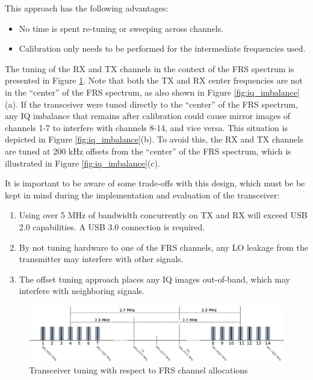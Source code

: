 This approach has the following advantages:
\begin{itemize}
  \item No time is spent re-tuning or sweeping across channels.
  \item Calibration only needs to be performed for the intermediate
        frequencies used.
\end{itemize}

The tuning of the \ac{RX} and \ac{TX} channels in the context of the
\ac{FRS} spectrum is presented in Figure \ref{fig:tuning}.  Note that both
the \ac{TX} and \ac{RX} center frequencies are not in the ``center'' of the
\ac{FRS} spectrum, as also shown in Figure \ref{fig:iq_imbalance}(a).
If the transceiver were tuned directly to the ``center'' of the \ac{FRS}
spectrum, any IQ imbalance that remains after calibration could cause mirror
images of channels 1-7 to interfere with channels 8-14, and vice versa. This situation
is depicted in Figure \ref{fig:iq_imbalance}(b). To avoid this, the \ac{RX} and
\ac{TX} channels are tuned at 200 kHz offsets from the ``center'' of the
\ac{FRS} spectrum, which is illustrated in Figure \ref{fig:iq_imbalance}(c).

It is important to be aware of some trade-offs with this design, which must be
be kept in mind during the implementation and evaluation of the transceiver:

\begin{enumerate}
    \item Using over 5 MHz of bandwidth concurrently on TX and RX will exceed USB 2.0 capabilities. A USB 3.0 connection is required.
    \item By not tuning hardware to one of the \ac{FRS} channels, any LO leakage from the transmitter may interfere with other signals.
    \item The offset tuning approach places any IQ images out-of-band, which may interfere with neighboring signals.
\end{enumerate}

\begin{figure}[t]
  \centering
  \includegraphics{images/frs/tuning.eps}
  \caption{Transceiver tuning with respect to FRS channel allocations}
  \label{fig:tuning}
\end{figure}

